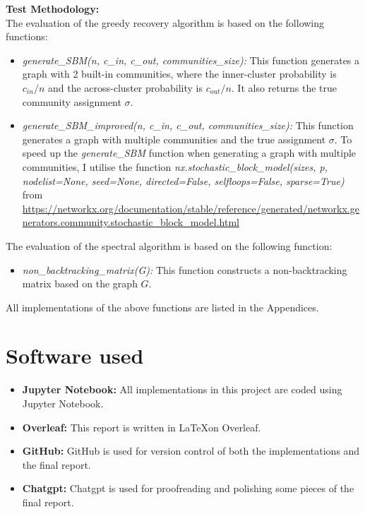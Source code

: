 \textbf{Test Methodology:}\\
The evaluation of the greedy recovery algorithm is based on the following functions:
\begin{itemize}
    \item \textit{generate\_SBM(n, c\_in, c\_out, communities\_size):}  This function generates a graph with 2 built-in communities, where the inner-cluster probability is $c_{in}/n$ and the across-cluster probability is $c_{out}/n$. It also returns the true community assignment $\sigma$.
    \item \textit{generate\_SBM\_improved(n, c\_in, c\_out, communities\_size):} This function generates a graph with multiple communities and the true assignment $\sigma$. To speed up the \textit{generate\_SBM} function when generating a graph with multiple communities, I utilise the function \textit{nx.stochastic\_block\_model(sizes, p, nodelist=None, seed=None, directed=False, selfloops=False, sparse=True)} from \url{https://networkx.org/documentation/stable/reference/generated/networkx.generators.community.stochastic_block_model.html}
\end{itemize}
The evaluation of the spectral algorithm is based on the following function:
\begin{itemize}
    \item \textit{non\_backtracking\_matrix(G):} This function constructs a non-backtracking matrix based on the graph $G$.
\end{itemize}
All implementations of the above functions are listed in the Appendices.

\section{Software used}
\begin{itemize}
    \item \textbf{Jupyter Notebook:} All implementations in this project are coded using Jupyter Notebook.
    \item \textbf{Overleaf:} This report is written in \LaTeX on Overleaf.
    \item \textbf{GitHub:} GitHub is used for version control of both the implementations and the final report.
    \item \textbf{Chatgpt:} Chatgpt is used for proofreading and polishing some pieces of the final report.
\end{itemize}

